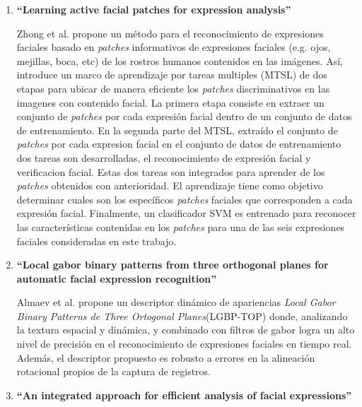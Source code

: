 \begin{enumerate}
\item {\textbf{“Learning active facial patches for expression analysis” \cite{zhong2012learning}}

Zhong et al. propone un método para el reconocimiento de expresiones faciales basado en \textit{patches} informativos de expresiones faciales (e.g. ojos, mejillas, boca, etc) de los rostros humanos contenidos en las imágenes. Así, introduce un marco de aprendizaje por tareas multiples (MTSL) de dos etapas para ubicar de manera eficiente los \textit{patches} discriminativos en las imagenes con contenido facial. La primera etapa consiste en extraer un conjunto de \textit{patches} por cada expresión facial dentro de un conjunto de datos de entrenamiento. En la segunda parte del MTSL, extraído el conjunto  de \textit{patches} por cada expresion facial en el conjunto de datos de entrenamiento dos tareas son desarrolladas, el reconocimiento de expresión facial y verificacion facial.  Estas dos tareas son integrados para aprender de los \textit{patches} obtenidos con anterioridad. El aprendizaje tiene como objetivo determinar cuales son los específicos \textit{patches} faciales que corresponden a cada expresión facial. Finalmente, un clasificador SVM es entrenado para reconocer las características contenidas en los \textit{patches} para una de las seis expresiones faciales consideradas en este trabajo. 
}

\item{\textbf{“Local gabor binary patterns from three orthogonal planes for automatic facial expression recognition” \cite{almaev2013local}}

Almaev et al.  propone un descriptor dinámico de apariencias \textit{Local Gabor Binary Patterns de Three Ortogonal Planes}(LGBP-TOP) donde, analizando la textura espacial y dinámica, y combinado con filtros de gabor logra un alto nivel de precisión en el reconocimiento de expresiones faciales en tiempo real. Además, el descriptor propuesto es robusto a errores en la alineación rotacional propios de la captura de registros.
}

\item{\textbf{“An integrated approach for efficient analysis of facial expressions” \cite{ghayoumi2014integrated}}

}
\end{enumerate}
